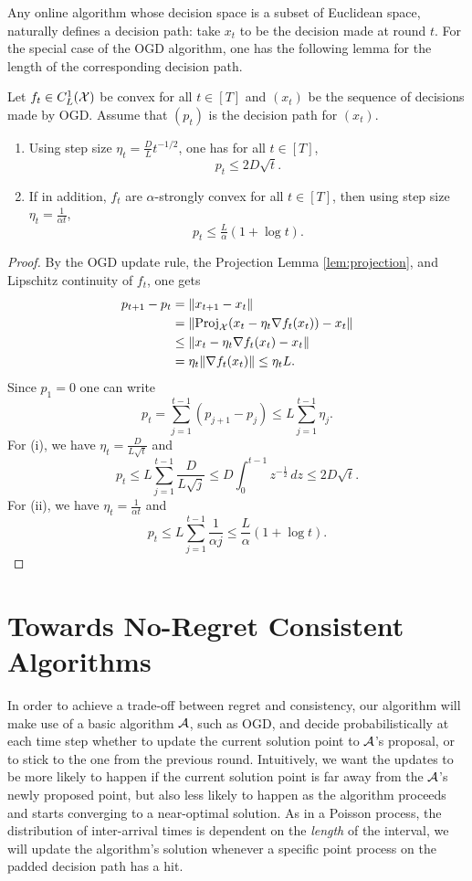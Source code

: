Any online algorithm whose decision space is a subset of Euclidean space, naturally defines a decision path: take $x_t$ to be the decision made at round $t$. For the special case of the OGD algorithm, one has the following lemma for the length of the corresponding decision path. 
\begin{lemma}
  Let $f_t\in C^1_L(\mathcal{X})$ be convex for all $t\in[T]$ and $(x_t)$ be the sequence of decisions made by OGD. Assume that $(p_t)$ is the decision path for $(x_t)$.
  \begin{enumerate}[label=(\roman*)]
      \item Using step size $\eta_t = \frac{D}{L}t^{-1/2}$, one has for all $t \in [T]$,
         \[ p_t \leq  2D \sqrt{t}. \]
     \item If in addition, $f_t$ are $\alpha$-strongly convex for all $t\in [T]$, then using step size $\eta_t=\frac{1}{\alpha t}$,
         \[ p_t \leq \tfrac{L}{\alpha}(1+\log t). \]
  \end{enumerate}
  \label{lem:ogdpathlength}
\end{lemma}
\begin{proof}
    By the OGD update rule, the Projection Lemma \ref{lem:projection}, and Lipschitz continuity of $f_t$, one gets
 \begin{align*}
   p_{t+1}-p_t &= \|x_{t+1} - x_t\| \\
   &= \|\mathrm{Proj}_{\mathcal{X}}(x_t - \eta_t\nabla f_t(x_t))-x_t\| \\
  &\leq \|x_t - \eta_t\nabla f_t(x_t)-x_t\| \\
  &= \eta_t\|\nabla f_t(x_t)\| \leq \eta_t L.
 \end{align*}
Since $p_1 = 0$ one can write
\[
  p_t = \sum_{j=1}^{t-1} (p_{j+1} - p_j) \leq L\sum_{j=1}^{t-1} \eta_j.
\]
For (i), we have $\eta_t = \frac{D}{L\sqrt{t}}$ and
   \[
   p_t \leq L\sum_{j=1}^{t-1} \frac{D}{L\sqrt{j}} \leq D \int_0^{t-1} z^{-\frac{1}{2}}\,dz \leq 2D\sqrt{t}.
 \]
For (ii), we have $\eta_t = \frac{1}{\alpha t}$ and
  \[
    p_t \leq L \sum_{j=1}^{t-1} \frac{1}{\alpha j} \leq \frac{L}{\alpha}(1+\log t).
 \]
\end{proof}

\section{Towards No-Regret Consistent Algorithms}

In order to achieve a trade-off between regret and consistency, our algorithm will make use of a basic algorithm $\mathcal{A}$, such as OGD, and decide probabilistically at each time step whether to update the current solution point to $\mathcal{A}$'s proposal, or to stick to the one from the previous round. Intuitively, we want the updates to be more likely to happen if the current solution point is far away from the $\mathcal{A}$'s newly proposed point, but also less likely to happen as the algorithm proceeds and starts converging to a near-optimal solution. As in a Poisson process, the distribution of inter-arrival times is dependent on the \emph{length} of the interval, we will update the algorithm's solution whenever a specific point process on the padded decision path has a hit. 

